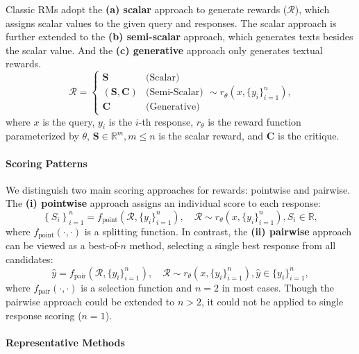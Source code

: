 \documentclass{article} %
\begin{document}
Classic RMs adopt the \textbf{(a) scalar} approach to generate rewards ($\mathcal{R}$), which assigns scalar values to the given query and responses. The scalar approach is further extended to the \textbf{(b) semi-scalar} approach, which generates texts besides the scalar value. And the \textbf{(c) generative} approach only generates textual rewards. 
\begin{equation}
  \mathcal{R} = \begin{cases}
    \boldsymbol{S} & \text{(Scalar)} \\
    \left(\boldsymbol{S}, \boldsymbol{C}\right) & \text{(Semi-Scalar)} \\
    \boldsymbol{C} & \text{(Generative)}
  \end{cases}
  \sim r_{\theta}\left(x, \{y_i\}_{i=1}^n\right),
\end{equation}
where $x$ is the query, $y_i$ is the $i$-th response, $r_{\theta}$ is the reward function parameterized by $\theta$, $\boldsymbol{S} \in \mathbb{R}^m, m \leq n$ is the scalar reward, and $\boldsymbol{C}$ is the critique. 

\paragraph{Scoring Patterns}

We distinguish two main scoring approaches for rewards: pointwise and pairwise. The \textbf{(i) pointwise} approach assigns an individual score to each response:
\begin{equation}
  \left\{ S_i \right\}_{i=1}^n = f_{\mathrm{point}}\left(\mathcal{R}, \{y_i\}_{i=1}^n\right), \quad \mathcal{R} \sim r_{\theta}\left(x, \{y_i\}_{i=1}^n\right), S_i \in \mathbb{R},
\end{equation}
where $f_{\mathrm{point}}(\cdot, \cdot)$ is a splitting function. 
In contrast, the \textbf{(ii) pairwise} approach can be viewed as a best-of-$n$ method, selecting a single best response from all candidates:
\begin{equation}
  \hat{y} = f_{\mathrm{pair}}(\mathcal{R}, \{y_i\}_{i=1}^n), \quad \mathcal{R} \sim r_{\theta}\left(x, \{y_i\}_{i=1}^n\right), \hat{y} \in \{y_i\}_{i=1}^n,
\end{equation}
where $f_{\mathrm{pair}}(\cdot, \cdot)$ is a selection function and $n=2$ in most cases. Though the pairwise approach could be extended to $n>2$, it could not be applied to single response scoring ($n=1$).

\paragraph{Representative Methods} 
\end{document}
